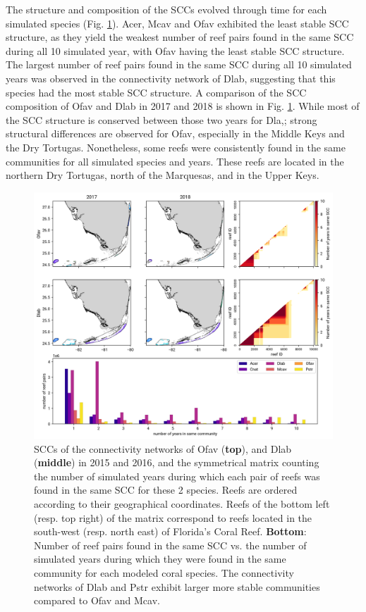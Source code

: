 \documentclass[preprint,12pt,authoryear]{elsarticle}
\begin{document}
The structure and composition of the SCCs evolved through time for each simulated species (Fig. \ref{fig:scc}). Acer, Mcav and Ofav exhibited the least stable SCC structure, as they yield the weakest number of reef pairs found in the same SCC during all 10 simulated year, with Ofav having the least stable SCC structure. The largest number of reef pairs found in the same SCC during all 10 simulated years was observed in the connectivity network of Dlab, suggesting that this species had the most stable SCC structure. A comparison of the SCC composition of Ofav and Dlab in 2017 and 2018 is shown in Fig. \ref{fig:scc}. While most of the SCC structure is conserved between those two years for Dla,; strong structural differences are observed for Ofav, especially in the Middle Keys and the Dry Tortugas. Nonetheless, some reefs were consistently found in the same communities for all simulated species and years. These reefs are located in the northern Dry Tortugas, north of the Marquesas, and in the Upper Keys.

\begin{figure}
    \centering
    \includegraphics[width=\textwidth]{figures/comparison_sccs.png}
    \caption{SCCs of the connectivity networks of Ofav (\textbf{top}), and Dlab (\textbf{middle}) in 2015 and 2016, and the symmetrical matrix counting the number of simulated years during which each pair of reefs was found in the same SCC for these 2 species. Reefs are ordered according to their geographical coordinates. Reefs of the bottom left (resp. top right) of the matrix correspond to reefs located in the south-west (resp. north east) of Florida's Coral Reef. \textbf{Bottom}: Number of reef pairs found in the same SCC vs. the number of simulated years during which they were found in the same community for each modeled coral species. The connectivity networks of Dlab and Pstr exhibit larger more stable communities compared to Ofav and Mcav.}\label{fig:scc}
\end{figure}
\end{document}
